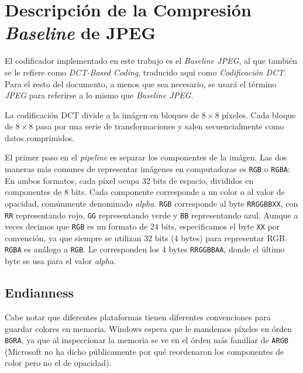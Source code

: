 \section{Descripción de la Compresión \emph{Baseline} de JPEG}

El codificador implementado en este trabajo es el \emph{Baseline JPEG}, al que
también se le refiere como \emph{DCT-Based Coding}, traducido aquí como
\emph{Codificación DCT}. Para el resto del documento, a menos que sea
necesario, se usará el término \emph{JPEG} para referirse a lo mismo que
\emph{Baseline JPEG}.

La codificación DCT divide a la imágen en bloques de $8\times8$ píxeles. Cada
bloque de $8\times8$ pasa por una serie de transformaciones y salen
secuencialmente como datos comprimidos.

El primer paso en el \emph{pipeline} es separar los componentes de la imágen.
Las dos maneras más comunes de representar imágenes en computadoras es
\verb+RGB+ o \verb+RGBA+: En ambos formatos, cada píxel ocupa 32 bits de
espacio, divididos en componentes de 8 bits. Cada componente corresponde a un
color o al valor de opacidad, comúnmente denominado \emph{alpha}. \verb+RGB+
corresponde al byte \verb+RRGGBBXX+, con \verb+RR+ representando rojo,
\verb+GG+ representando verde y \verb+BB+ representando azul. Aunque a veces
decimos que \verb+RGB+ es un formato de 24 bits, especificamos el byte
\verb+XX+ por convención, ya que siempre se utilizan 32 bits (4 bytes) para
representar RGB. \verb+RGBA+ es análogo a \verb+RGB+. Le corresponden los 4
bytes \verb+RRGGBBAA+, donde el último byte se usa para el valor \emph{alpha}.

\subsection{Endianness}

Cabe notar que diferentes plataformas tienen diferentes convenciones para
guardar colores en memoria. Windows espera que le mandemos píxeles en órden
\verb+BGRA+, ya que al inspeccionar la memoria se ve en el órden más familiar
de \verb+ARGB+ (Microsoft no ha dicho públicamente por qué reordenaron los
componentes de color pero no el de opacidad).

